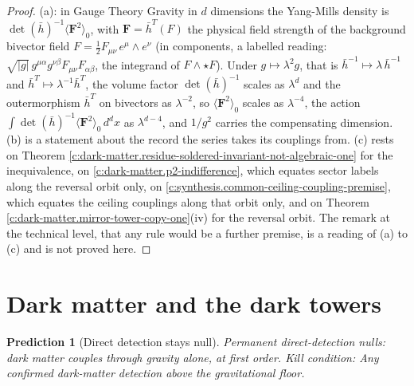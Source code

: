 \documentclass[11pt]{article}
\newtheorem{prediction}[theorem]{Prediction}
\theoremstyle{definition}
\theoremstyle{plain}
\providecommand{\hb}{}\renewcommand{\hb}{\bar{h}}
\begin{document}
\begin{proof}
(a): in Gauge Theory Gravity in $d$ dimensions the Yang-Mills density is $\det(\hb)^{-1}\langle\mathbf{F}^{2}\rangle_{0}$, with $\mathbf{F} = \hb^{T}(F)$ the physical field strength of the background bivector field $F = \tfrac12 F_{\mu\nu}\,e^{\mu}\wedge e^{\nu}$ (in components, a labelled reading: $\sqrt{|g|}\,g^{\mu\alpha}g^{\nu\beta}F_{\mu\nu}F_{\alpha\beta}$, the integrand of $F \wedge \star F$). Under $g \mapsto \lambda^{2}g$, that is $\hb^{-1} \mapsto \lambda\,\hb^{-1}$ and $\hb^{T} \mapsto \lambda^{-1}\hb^{T}$, the volume factor $\det(\hb)^{-1}$ scales as $\lambda^{d}$ and the outermorphism $\hb^{T}$ on bivectors as $\lambda^{-2}$, so $\langle\mathbf{F}^{2}\rangle_{0}$ scales as $\lambda^{-4}$, the action $\int\det(\hb)^{-1}\langle\mathbf{F}^{2}\rangle_{0}\,d^{d}x$ as $\lambda^{d-4}$, and $1/g^{2}$ carries the compensating dimension. (b) is a statement about the record the series takes its couplings from. (c) rests on Theorem \ref{c:dark-matter.residue-soldered-invariant-not-algebraic-one} for the inequivalence, on \ref{c:dark-matter.p2-indifference}, which equates sector labels along the reversal orbit only, on \ref{c:synthesis.common-ceiling-coupling-premise}, which equates the ceiling couplings along that orbit only, and on Theorem \ref{c:dark-matter.mirror-tower-copy-one}(iv) for the reversal orbit. The remark at the technical level, that any rule would be a further premise, is a reading of (a) to (c) and is not proved here.

\end{proof}

\section{Dark matter and the dark towers}

\begin{prediction}[Direct detection stays null]\label{c:pred.dark-matter-direct-detection-null}
Permanent direct-detection nulls: dark matter couples through gravity alone, at first order.
\emph{Kill condition:} Any confirmed dark-matter detection above the gravitational floor.
\end{prediction}
\end{document}
